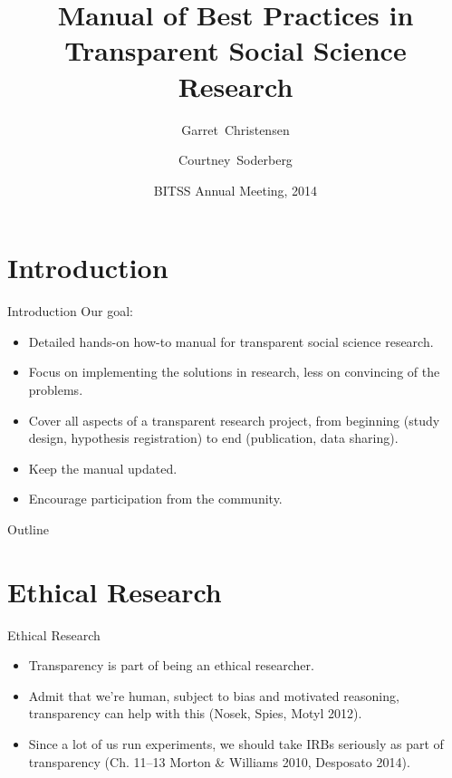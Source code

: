 \documentclass{beamer}
\title[Manual of Best Practices in Transparent Research] %
{Manual of Best Practices in Transparent Social Science Research}
\subtitle
{}
\author[Christensen, Soderberg] %
{Garret~Christensen\inst{1} \and Courtney~Soderberg\inst{2}}
\institute[Universities of Somewhere and Elsewhere] %
{
  \inst{1}%
  Berkeley Initiative for Transparency in the Social Sciences\\
  UC Berkeley
  \and
  \inst{2}%
  Center for Open Science\\
  }
\date[BITSS2014] %
{BITSS Annual Meeting, 2014}
\begin{document}
\begin{frame}
  \titlepage
\end{frame}






\section{Introduction}
 \begin{frame}{Introduction}
 Our goal:
 \begin{itemize}
 \item
 Detailed hands-on how-to manual for transparent social science research. 
 \item Focus on implementing the solutions in research, less on convincing of the problems.
 \item 
 Cover all aspects of a transparent research project, from beginning (study design, hypothesis registration) to end (publication, data sharing).
 \item 
 Keep the manual updated.
 \item
 Encourage participation from the community.
 \end{itemize}
\end{frame} 
\begin{frame}{Outline}
  \tableofcontents
\end{frame}
\section{Ethical Research}
\begin{frame}{Ethical Research}
\begin{itemize}
\item
Transparency is part of being an ethical researcher. 
\item
Admit that we're human, subject to bias and motivated reasoning, transparency can help with this (Nosek, Spies, Motyl 2012).
\item
Since a lot of us run experiments, we should take IRBs seriously as part of transparency (Ch. 11--13 Morton \& Williams 2010, Desposato 2014). 
\end{itemize}
\end{frame}
\end{document}
